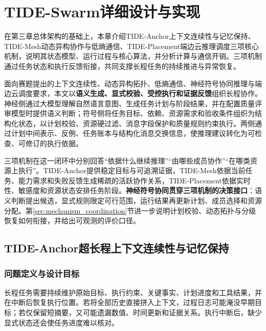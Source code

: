 \chapter{TIDE-Swarm详细设计与实现}
在第三章总体架构的基础上，本章介绍TIDE-Anchor上下文连续性与记忆保持、TIDE-Mesh动态异构协作与低熵通信、TIDE-Placement端边云推理调度三项核心机制，说明其状态模型、运行过程与核心算法，并分析计算与通信开销。三项机制通过任务状态和执行反馈衔接，共同支撑长程任务的持续推进与异常恢复。

面向赛题提出的上下文连续性、动态异构拓扑、低熵通信、神经符号协同推理与端边云调度要求，本文以\textbf{语义生成、显式校验、受控执行和证据反馈}组织长程协作。神经侧通过大模型理解自然语言意图、生成任务计划与阶段结果，并在配置质量评审模型时提供语义判断；符号侧将任务目标、依赖、资源需求和验收条件组织为结构化状态，以计划校验、资源硬过滤、消息字段保护和质量规则约束执行。两侧通过计划中间表示、反例、任务账本与结构化消息交换信息，使推理建议转化为可检查、可修订的执行依据。

三项机制在这一闭环中分别回答“依据什么继续推理”“由哪些成员协作”“在哪类资源上执行”。TIDE-Anchor提供稳定目标与可追溯证据，TIDE-Mesh依据当前任务、能力需求和失败反馈生成稀疏的活跃协作关系，TIDE-Placement依据实时性、敏感度和资源状态安排任务阶段。\textbf{神经符号协同贯穿三项机制的决策接口}：语义判断提出候选，显式规则限定可行范围，运行结果再更新计划、成员选择和资源分配。第\ref{sec:mechanism_coordination}节进一步说明计划校验、动态拓扑与分级恢复如何衔接，并给出可观测的评价口径。



\section{TIDE-Anchor超长程上下文连续性与记忆保持}
\label{sec:tide_anchor}

\subsection{问题定义与设计目标}

长程任务需要持续维护原始目标、执行约束、关键事实、计划进度和工具结果，并在中断后恢复执行位置。若将全部历史直接拼入上下文，过程日志可能淹没早期目标；若仅保留短摘要，又可能遗漏数值、时间更新和证据关系。执行中断后，缺少显式状态还会使任务进度难以核对。

